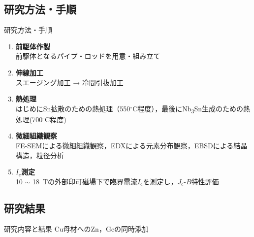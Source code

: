 \documentclass[aspectratio=169, unicode, 10pt]{beamer}
\begin{document}
	\subsection{研究方法・手順}
	\begin{frame}{研究方法・手順}
		\begin{enumerate}
			\item \textbf{前駆体作製} \\
				前駆体となるパイプ・ロッドを用意・組み立て
			\item \textbf{伸線加工} \\
				スエージング加工 → 冷間引抜加工
			\item \textbf{熱処理} \\
				はじめにSn拡散のための熱処理（550$^\circ$C程度），最後にNb\textsubscript{3}Sn生成のための熱処理(700$^\circ$C程度)
			\item \textbf{微細組織観察} \\
				FE-SEMによる微細組織観察，EDXによる元素分布観察，EBSDによる結晶構造，粒径分析
			\item \textbf{$I_\mathrm{c}$測定} \\
				10 $\sim$ 18~Tの外部印可磁場下で臨界電流$I_\mathrm{c}$を測定し，$J_\mathrm{c}$-$B$特性評価
		\end{enumerate}
	\end{frame}

	\subsection{研究結果}
	\begin{frame}{研究内容と結果}
		\centering
		{\LARGE Cu母材へのZn，Geの同時添加}
	\end{frame}
\end{document}
